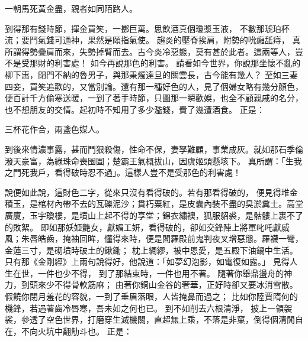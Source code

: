 一朝馬死黃金盡，親者如同陌路人。

到得那有錢時節，揮金買笑，一擲巨萬。思飲酒真個瓊漿玉液，
不數那琥珀杯流；要鬥氣錢可通神，果然是頤指氣使。
趨炎的壓脊挨肩，附勢的吮癰舐痔，
真所謂得勢疊肩而來，失勢掉臂而去。古今炎冷惡態，莫有甚於此者。這兩等人，豈不是受那財的利害處！
如今再說那色的利害。
請看如今世界，你說那坐懷不亂的柳下惠，閉門不納的魯男子，與那秉燭達旦的關雲長，古今能有幾人？
至如三妻四妾，買笑追歡的，又當別論。還有那一種好色的人，見了個婦女略有幾分顏色，便百計千方偷寒送暖，一到了著手時節，只圖那一瞬歡娛，也全不顧親戚的名分，也不想朋友的交情。起初時不知用了多少濫錢，費了幾遭酒食。
正是：

三杯花作合，兩盞色媒人。

到後來情濃事露，甚而鬥狠殺傷，性命不保，妻孥難顧，事業成灰。就如那石季倫潑天豪富，為綠珠命喪囹圄；楚霸王氣概拔山，因虞姬頭懸垓下。
真所謂：「生我之門死我戶，看得破時忍不過」。這樣人豈不是受那色的利害處！

說便如此說，這財色二字，從來只沒有看得破的。若有那看得破的，
便見得堆金積玉，是棺材內帶不去的瓦礫泥沙；貫朽粟紅，是皮囊內裝不盡的臭淤糞土。高堂廣廈，玉宇瓊樓，是墳山上起不得的享堂；錦衣繡襖，狐服貂裘，是骷髏上裹不了的敗絮。
即如那妖姬艷女，獻媚工妍，看得破的，卻如交鋒陣上將軍叱吒獻威風；朱唇皓齒，掩袖回眸，懂得來時，便是閻羅殿前鬼判夜叉增惡態。羅襪一彎，金蓮三寸，是砌墳時破土的鍬鋤；
枕上綢繆，被中恩愛，是五殿下油鍋中生活。
只有那《金剛經》上兩句說得好，他說道：「如夢幻泡影，如電復如露。」
見得人生在世，一件也少不得，
到了那結束時，一件也用不著。
隨著你舉鼎盪舟的神力，到頭來少不得骨軟筋麻；
由著你銅山金谷的奢華，正好時卻又要冰消雪散。
假饒你閉月羞花的容貌，一到了垂眉落眼，人皆掩鼻而過之；
比如你陸賈隋何的機鋒，若遇著齒冷唇寒，吾未如之何也已。
到不如削去六根清淨，
披上一領袈裟，參透了空色世界，打磨穿生滅機關，直超無上乘，不落是非窠，倒得個清閒自在，不向火坑中翻觔斗也。
正是：


